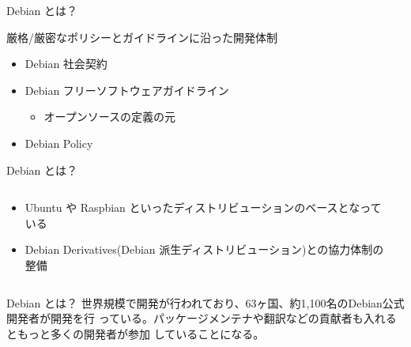 \documentclass[cjk,c,squeeze,shrink,dvipdfmx,12pt]{beamer}
\begin{document}
\begin{frame}[fragile]{Debian とは？}

  厳格/厳密なポリシーとガイドラインに沿った開発体制
  \begin{itemize}
  \item Debian 社会契約
  \item Debian フリーソフトウェアガイドライン
    \begin{itemize}
    \item オープンソースの定義の元
    \end{itemize}
  \item Debian Policy
  \end{itemize}

\end{frame}

\begin{frame}[fragile]{Debian とは？}
  \begin{columns}
    \begin{column}{.58\paperwidth}
      \begin{itemize}
      \item
        Ubuntu や Raspbian といったディストリビューションのベースとなっている
      \item
        Debian Derivatives(Debian 派生ディストリビューション)との協力体制の整備
      \end{itemize}
    \end{column}
    \begin{column}{.4\paperwidth}
      \centering
    \end{column}
  \end{columns}
\end{frame}

\begin{frame}[fragile]{Debian とは？}
 世界規模で開発が行われており、63ヶ国、約1,100名のDebian公式開発者が開発を行
 っている。パッケージメンテナや翻訳などの貢献者も入れるともっと多くの開発者が参加
 していることになる。

 \centering
\end{frame}
\end{document}
